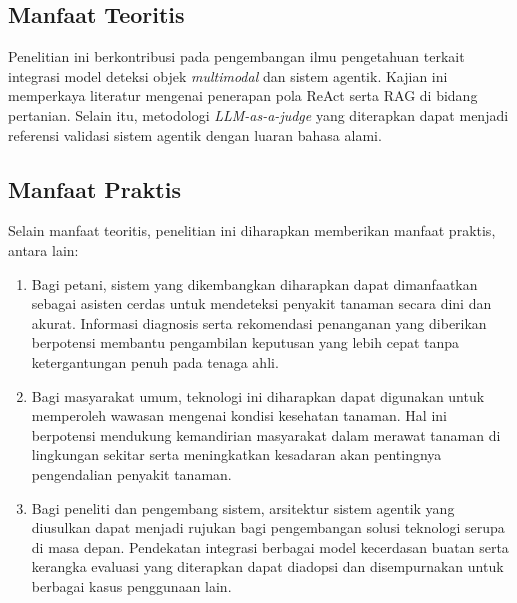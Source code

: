 \subsection{Manfaat Teoritis}
Penelitian ini berkontribusi pada pengembangan ilmu pengetahuan terkait integrasi model deteksi objek \textit{multimodal} dan sistem agentik. Kajian ini memperkaya literatur mengenai penerapan pola ReAct serta RAG di bidang pertanian. Selain itu, metodologi \textit{LLM-as-a-judge} yang diterapkan dapat menjadi referensi validasi sistem agentik dengan luaran bahasa alami.

\subsection{Manfaat Praktis}
Selain manfaat teoritis, penelitian ini diharapkan memberikan manfaat praktis, antara lain:
\begin{enumerate}[nosep]
    \item Bagi petani, sistem yang dikembangkan diharapkan dapat dimanfaatkan sebagai asisten cerdas untuk mendeteksi penyakit tanaman secara dini dan akurat. Informasi diagnosis serta rekomendasi penanganan yang diberikan berpotensi membantu pengambilan keputusan yang lebih cepat tanpa ketergantungan penuh pada tenaga ahli.
    \item Bagi masyarakat umum, teknologi ini diharapkan dapat digunakan untuk memperoleh wawasan mengenai kondisi kesehatan tanaman. Hal ini berpotensi mendukung kemandirian masyarakat dalam merawat tanaman di lingkungan sekitar serta meningkatkan kesadaran akan pentingnya pengendalian penyakit tanaman.
    \item Bagi peneliti dan pengembang sistem, arsitektur sistem agentik yang diusulkan dapat menjadi rujukan bagi pengembangan solusi teknologi serupa di masa depan. Pendekatan integrasi berbagai model kecerdasan buatan serta kerangka evaluasi yang diterapkan dapat diadopsi dan disempurnakan untuk berbagai kasus penggunaan lain.
\end{enumerate}




